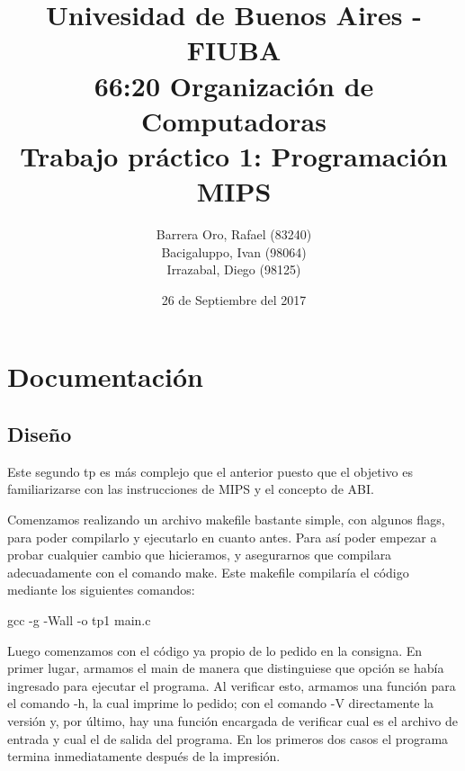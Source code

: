 \documentclass[10pt,a4paper]{article}
\begin{document}
\date{26 de Septiembre del 2017}

\title{Univesidad de Buenos Aires - FIUBA \\ 66:20 Organización de Computadoras \\ Trabajo práctico 1: Programación MIPS}

\author{Barrera Oro, Rafael (83240) \\ Bacigaluppo, Ivan (98064) \\ Irrazabal, Diego (98125)}

\maketitle

\thispagestyle{empty}

\newpage

\setcounter{page}{1}

\tableofcontents

\newpage

\section{Documentación}

\subsection{Diseño}

Este segundo tp es más complejo que el anterior puesto que el objetivo es familiarizarse con las instrucciones de MIPS y el concepto de ABI.

Comenzamos realizando un archivo makefile bastante simple, con algunos flags, para poder compilarlo y ejecutarlo en cuanto antes. Para así poder empezar a probar cualquier cambio que hicieramos, y asegurarnos que compilara adecuadamente con el comando make. Este makefile compilaría el código mediante los siguientes comandos:

	gcc -g -Wall -o tp1 main.c

Luego comenzamos con el código ya propio de lo pedido en la consigna. En primer lugar, armamos el main de manera que distinguiese que opción se había ingresado para ejecutar el programa. Al verificar esto, armamos una función para el comando -h, la cual imprime lo pedido; con el comando -V directamente la versión y, por último, hay una función encargada de verificar cual es el archivo de entrada y cual el de salida del programa. En los primeros dos casos el programa termina inmediatamente después de la impresión.
\end{document}

